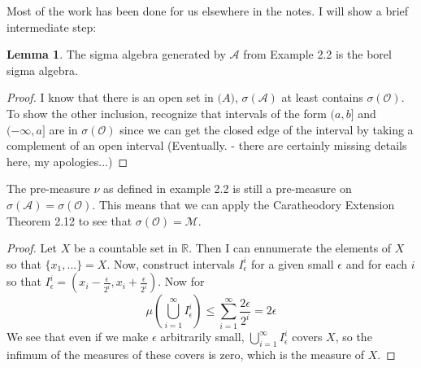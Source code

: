 \documentclass[12pt]{article}
\newenvironment{problem}[2][Problem]{\begin{trivlist}
\item[\hskip \labelsep {\bfseries #1}\hskip \labelsep {\bfseries #2.}]}{\end{trivlist}}
\theoremstyle{definition}
\theoremstyle{definition}
\newtheorem{lemma}{Lemma}[section]
\theoremstyle{definition}
\theoremstyle{definition}
\begin{document}
\begin{problem}{2.14} Most of the work has been done for us elsewhere in the notes. I will show a brief intermediate step:
\begin{lemma}
The sigma algebra generated by $\mathcal{A}$ from Example 2.2 is the borel sigma algebra.
\end{lemma}
\begin{proof}
I know that there is an open set in $\mathcal(A)$, $\sigma(\mathcal{A})$ at least contains $\sigma(\mathcal{O})$. To show the other inclusion, recognize that intervals of the form $(a,b]$ and $(-\infty, a]$ are in $\sigma(\mathcal{O})$ since we can get the closed edge of the interval by taking a complement of an open interval (Eventually. - there are certainly missing details here, my apologies...) 
\end{proof}
The pre-measure $\nu$ as defined in example 2.2 is still a pre-measure on $\sigma(\mathcal{A}) = \sigma(\mathcal{O}).$ This means that we can apply the Caratheodory Extension Theorem 2.12 to see that $\sigma(\mathcal{O}) = \mathcal{M}$.
\end{problem}

\begin{problem}{3.1}
\begin{proof}
Let $X$ be a countable set in $\mathbb{R}$. Then I can ennumerate the elements of $X$ so that $\{x_1, ... \} = X$. Now, construct intervals $I_\epsilon^i$ for a given small $\epsilon$ and for each $i$ so that $I_\epsilon^i = (x_i - \frac{\epsilon}{2^i}, x_i + \frac{\epsilon}{2^i})$. Now for $$\mu(\bigcup_{i=1}^\infty I^i_\epsilon) \leq \sum_{i=1}^{\infty} \frac{2\epsilon}{2^i} = 2\epsilon$$
We see that even if we make $\epsilon$ arbitrarily small, $\bigcup_{i=1}^\infty I^i_\epsilon$ covers $X$, so the infimum of the measures of these covers is zero, which is the measure of $X$.
\end{proof}
\end{problem}
\end{document}
